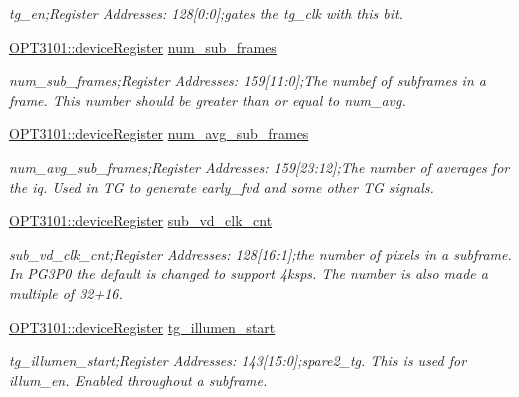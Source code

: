 \begin{DoxyCompactItemize}
\begin{DoxyCompactList}\small\item\em tg\+\_\+en;Register Addresses\+: 128\mbox{[}0\+:0\mbox{]};gates the tg\+\_\+clk with this bit. \end{DoxyCompactList}\item 
\mbox{\hyperlink{class_o_p_t3101_1_1device_register}{O\+P\+T3101\+::device\+Register}} \mbox{\hyperlink{class_o_p_t3101_1_1registers_a580fcd93b67fc370744aa6f366a0cf27}{num\+\_\+sub\+\_\+frames}}
\begin{DoxyCompactList}\small\item\em num\+\_\+sub\+\_\+frames;Register Addresses\+: 159\mbox{[}11\+:0\mbox{]};The numbef of subframes in a frame. This number should be greater than or equal to num\+\_\+avg. \end{DoxyCompactList}\item 
\mbox{\hyperlink{class_o_p_t3101_1_1device_register}{O\+P\+T3101\+::device\+Register}} \mbox{\hyperlink{class_o_p_t3101_1_1registers_a9b89956eebb5258cbb968ba07182c98c}{num\+\_\+avg\+\_\+sub\+\_\+frames}}
\begin{DoxyCompactList}\small\item\em num\+\_\+avg\+\_\+sub\+\_\+frames;Register Addresses\+: 159\mbox{[}23\+:12\mbox{]};The number of averages for the iq. Used in TG to generate early\+\_\+fvd and some other TG signals. \end{DoxyCompactList}\item 
\mbox{\hyperlink{class_o_p_t3101_1_1device_register}{O\+P\+T3101\+::device\+Register}} \mbox{\hyperlink{class_o_p_t3101_1_1registers_abc883ba2fcc4156c6e28e3b673de0a1a}{sub\+\_\+vd\+\_\+clk\+\_\+cnt}}
\begin{DoxyCompactList}\small\item\em sub\+\_\+vd\+\_\+clk\+\_\+cnt;Register Addresses\+: 128\mbox{[}16\+:1\mbox{]};the number of pixels in a subframe. In P\+G3\+P0 the default is changed to support 4ksps. The number is also made a multiple of 32+16. \end{DoxyCompactList}\item 
\mbox{\hyperlink{class_o_p_t3101_1_1device_register}{O\+P\+T3101\+::device\+Register}} \mbox{\hyperlink{class_o_p_t3101_1_1registers_adf94f254c8aa46637771a1b01949d680}{tg\+\_\+illumen\+\_\+start}}
\begin{DoxyCompactList}\small\item\em tg\+\_\+illumen\+\_\+start;Register Addresses\+: 143\mbox{[}15\+:0\mbox{]};spare2\+\_\+tg. This is used for illum\+\_\+en. Enabled throughout a subframe. \end{DoxyCompactList}\item 

\end{DoxyCompactItemize}
